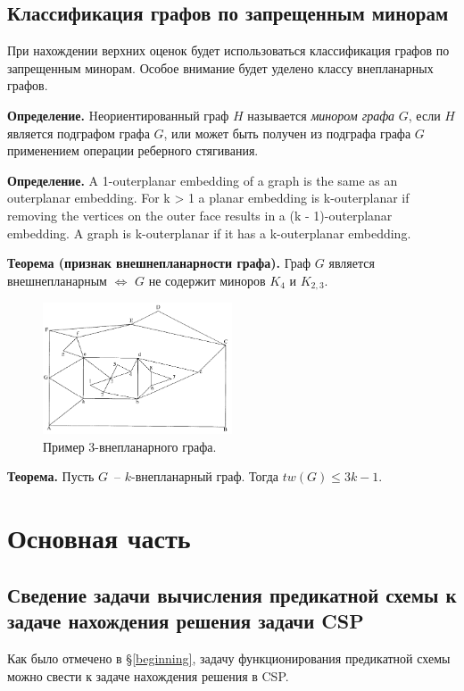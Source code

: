 \documentclass[12pt]{article}
\begin{document}
\subsection{Классификация графов по запрещенным минорам}
При нахождении верхних оценок будет использоваться классификация графов по запрещенным минорам.
Особое внимание будет уделено классу внепланарных графов.

\textbf{Определение.}
Hеориентированный граф $H$ называется \textit{минором графа} $G$, если $H$
является подграфом графа $G$, или может быть получен из подграфа графа $G$ применением операции реберного стягивания.

\textbf{Определение.}
A 1-outerplanar embedding of a graph is the same as an outerplanar embedding. 
For k > 1 a planar embedding is k-outerplanar if removing the vertices on the outer
face results in a (k - 1)-outerplanar embedding. A graph is k-outerplanar if it has a 
k-outerplanar embedding.

\textbf{Теорема (признак внешнепланарности графа).}
Граф $G$ является внешнепланарным $\iff$ $G$ не содержит миноров $K_4$ и $K_{2,3}$\cite{Diestel00}.

\begin{figure}[htb]
\centering
\includegraphics[width=0.50\textwidth]{outerplanar.png}
\caption{Пример 3-внепланарного графа.}
\label{fig:outerplanar_graph}
\end{figure}

\textbf{Теорема.}
Пусть $G$~-- $k$-внепланарный граф. Тогда $tw(G) \leq 3k-1.$\cite{Boedlander96}


\section{Основная часть}
\subsection{Сведение задачи вычисления предикатной схемы к задаче нахождения решения задачи CSP}
Как было отмечено в \S \ref{beginning}, задачу функционирования предикатной схемы можно свести к задаче нахождения решения в CSP. 
\end{document}
